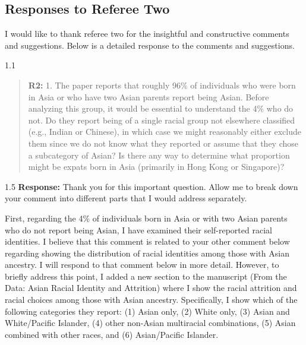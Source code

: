 \documentclass[12pt,english]{article}
\newcommand{\rrquote}{1.1}
\newcommand{\rrxspc}{1.5}
\begin{document}
\begin{refsection}
    \section{Responses to Referee Two}
    I would like to thank referee two for the insightful and constructive comments and suggestions. Below is a detailed response to the comments and suggestions.

    \begin{spacing}{\rrquote}
        \begin{quotation}
        \textbf{R2: } 1. The paper reports that roughly 96\% of individuals who were born in Asia or who have two Asian parents report being Asian. Before analyzing this group, it would be essential to understand the 4\% who do not. Do they report being of a single racial group not elsewhere classified (e.g., Indian or Chinese), in which case we might reasonably either exclude them since we do not know what they reported or assume that they chose a subcategory of Asian? Is there any way to determine what proportion might be expats born in Asia (primarily in Hong Kong or Singapore)?
        \end{quotation}
        \end{spacing}
        
        \begin{spacing}{\rrxspc}
            \textbf{Response:}  Thank you for this important question. Allow me to break down your comment into different parts that I would address separately. 

            First, regarding the 4\% of individuals born in Asia or with two Asian parents who do not report being Asian, I have examined their self-reported racial identities. I believe that this comment is related to your other comment below regarding showing the distribution of racial identities among those with Asian ancestry. I will respond to that comment below in more detail. However, to briefly address this point, I added a new section to the manuscript (From the Data: Asian Racial Identity and Attrition) where I show the racial attrition and racial choices among those with Asian ancestry. Specifically, I show which of the following categories they report: (1) Asian only, (2) White only, (3) Asian and White/Pacific Islander, (4) other non-Asian multiracial combinations, (5) Asian combined with other races, and (6) Asian/Pacific Islander. 


\end{spacing}
\end{refsection}
\end{document}
